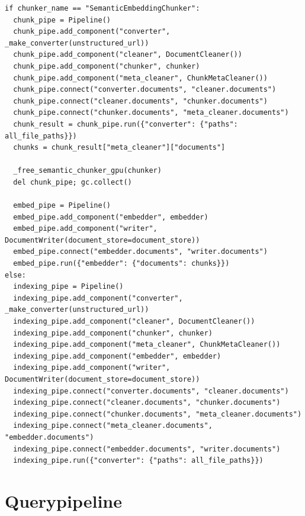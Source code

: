 \begin{listing}[H]
\begin{verbatim}
if chunker_name == "SemanticEmbeddingChunker":
  chunk_pipe = Pipeline()
  chunk_pipe.add_component("converter", _make_converter(unstructured_url))
  chunk_pipe.add_component("cleaner", DocumentCleaner())
  chunk_pipe.add_component("chunker", chunker)
  chunk_pipe.add_component("meta_cleaner", ChunkMetaCleaner())
  chunk_pipe.connect("converter.documents", "cleaner.documents")
  chunk_pipe.connect("cleaner.documents", "chunker.documents")
  chunk_pipe.connect("chunker.documents", "meta_cleaner.documents")
  chunk_result = chunk_pipe.run({"converter": {"paths": all_file_paths}})
  chunks = chunk_result["meta_cleaner"]["documents"]

  _free_semantic_chunker_gpu(chunker)
  del chunk_pipe; gc.collect()

  embed_pipe = Pipeline()
  embed_pipe.add_component("embedder", embedder)
  embed_pipe.add_component("writer", DocumentWriter(document_store=document_store))
  embed_pipe.connect("embedder.documents", "writer.documents")
  embed_pipe.run({"embedder": {"documents": chunks}})
else:
  indexing_pipe = Pipeline()
  indexing_pipe.add_component("converter", _make_converter(unstructured_url))
  indexing_pipe.add_component("cleaner", DocumentCleaner())
  indexing_pipe.add_component("chunker", chunker)
  indexing_pipe.add_component("meta_cleaner", ChunkMetaCleaner())
  indexing_pipe.add_component("embedder", embedder)
  indexing_pipe.add_component("writer", DocumentWriter(document_store=document_store))
  indexing_pipe.connect("converter.documents", "cleaner.documents")
  indexing_pipe.connect("cleaner.documents", "chunker.documents")
  indexing_pipe.connect("chunker.documents", "meta_cleaner.documents")
  indexing_pipe.connect("meta_cleaner.documents", "embedder.documents")
  indexing_pipe.connect("embedder.documents", "writer.documents")
  indexing_pipe.run({"converter": {"paths": all_file_paths}})
\end{verbatim}
\caption[Indexeringslogica: tweeledige uitvoering voor semantische chunking, lineair voor de rest]{De tweeledige uitvoering vrijwaart de \gls{gpu} van gelijktijdige belasting. In beide paden is de \texttt{ChunkMetaCleaner} aanwezig die de pagina-markers verwerkt en chunks dedupliceert (Sectie~\ref{subsec:chunkmetacleaner}).}
\end{listing}

\section{Querypipeline}
\label{sec:query-pipeline}


